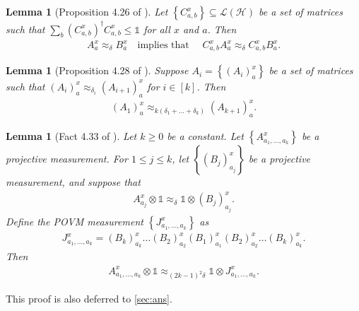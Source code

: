 \documentclass[11pt]{article}
\theoremstyle{plain}
\newtheorem{lemma}[theorem]{Lemma}
\theoremstyle{definition}
\newcommand {\set} [1] {\ensuremath{ \left\lbrace #1 \right\rbrace }}
\newcommand {\id} {\ensuremath{\mathds{1}}}
\newcommand{\x}{\otimes}
\newcommand{\ct}{^{\dagger}}
\newcommand{\calH}{\mathcal{H}}
\newcommand{\calL}{\mathcal{L}}
\newcommand{\appd}[1]{\approx_{#1}}
\newcommand{\1}{\mathbb{1}} %
\begin{document}
\begin{lemma}[Proposition 4.26 of \cite{JNVWYuen'20}]
\label{lm:prod_meas}
Let $\set{ C^x_{a,b} } \subseteq \calL(\calH)$ be a set of matrices such that $\sum_{b} (C^x_{a,b})\ct C^x_{a,b} \leq \id$
for all $x$ and $a$.
Then
\begin{align*}
	A^{x}_a \appd{\delta} B^{x}_a \quad \text{implies that } \quad C^x_{a,b}A^x_a \appd{\delta} C^x_{a,b}B^x_a. 
\end{align*}
\end{lemma}
\begin{lemma}[Proposition 4.28 of \cite{JNVWYuen'20}]
\label{lm:chain_rule}
	Suppose $A_i = \set{ (A_i)^x_a}$ be a set of matrices such that $(A_i)^x_a \appd{\delta_i} (A_{i+1})^x_a$
	for $i \in [k]$. Then 
	\begin{align*}
		(A_1)^x_ a \appd{k(\delta_1 + \ldots + \delta_k)} (A_{k+1})^x_a.
	\end{align*}
\end{lemma}
\begin{lemma}[Fact 4.33 of \cite{neexp}]
	\label{lm:k_prod}
	Let $k \geq 0$ be a constant.
	Let $\set{ A^x_{a_1, \dots, a_k}}$ be a projective measurement.
	For $1 \leq j \leq k$, let $\set{ (B_j)^x_{a_j} }$ be a projective measurement, and suppose that 
	\begin{align*}
		A^x_{a_j} \x \id \appd{\delta} \id \x (B_j)^{x}_{a_j}.
	\end{align*}
	Define the POVM measurement $\set{J^x_{a_1, \dots, a_k}}$ as
	\begin{align*}
		J^x_{a_1, \ldots, a_k} = (B_k)^x_{a_k} \dots (B_2)^{x}_{a_2} (B_1)^x_{a_1} (B_2)^x_{a_2} \dots (B_k)^x_{a_k}.
	\end{align*}
	Then
	\begin{align*}
		A^x_{a_1, \ldots, a_k} \x \id \appd{ (2k-1)^2 \delta }  \id \x J^x_{a_1, \ldots, a_k}.
	\end{align*}
\end{lemma}
This proof is also deferred to \cref{sec:ans}.
\end{document}
